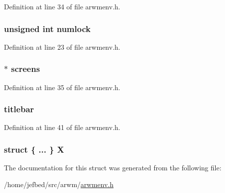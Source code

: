 Definition at line 34 of file arwmenv.h.

\hypertarget{struct_a_r_w_m_environment_ae224c1b4a34d4250337c9f98f11bbc19}{
\subsubsection[{numlock}]{\setlength{\rightskip}{0pt plus 5cm}unsigned int {\bf numlock}}}
\label{struct_a_r_w_m_environment_ae224c1b4a34d4250337c9f98f11bbc19}


Definition at line 23 of file arwmenv.h.

\hypertarget{struct_a_r_w_m_environment_afa064ef94c863dff48200952ffb4b3b7}{
\subsubsection[{screens}]{$\ast$ {\bf screens}}}
\label{struct_a_r_w_m_environment_afa064ef94c863dff48200952ffb4b3b7}


Definition at line 35 of file arwmenv.h.

\hypertarget{struct_a_r_w_m_environment_af924e7310bb0b594a441bb7f7f99bc6b}{
\subsubsection[{titlebar}]{ {\bf titlebar}}}
\label{struct_a_r_w_m_environment_af924e7310bb0b594a441bb7f7f99bc6b}


Definition at line 41 of file arwmenv.h.

\hypertarget{struct_a_r_w_m_environment_ae528833f8e635aa8254dab1c00b1e1c1}{
\subsubsection[{X}]{\setlength{\rightskip}{0pt plus 5cm}struct \{ ... \}   {\bf X}}}
\label{struct_a_r_w_m_environment_ae528833f8e635aa8254dab1c00b1e1c1}


The documentation for this struct was generated from the following file:\begin{DoxyCompactItemize}
\item 
/home/jefbed/src/arwm/\hyperlink{arwmenv_8h}{arwmenv.h}\end{DoxyCompactItemize}
